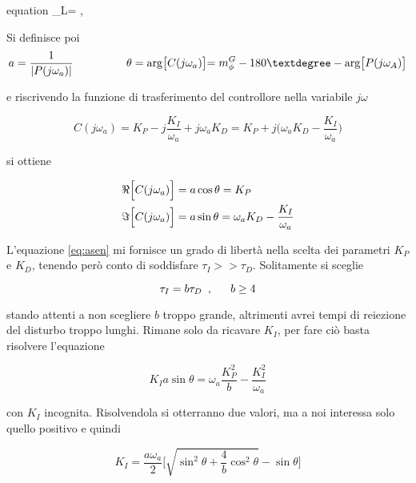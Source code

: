 		\begin{empheq}[box=%
		\fbox]{equation}
			\tau_L=\alpha{} \singleSpacing, \trippleSpacing {}\le\alpha\le{}
			\label{eq:tauL}
		\end{empheq}
		
		\noindent Si definisce poi 
		\begin{equation}
			a=\frac{1}{|P(j\omega_a)|} \trippleSpacing \trippleSpacing \trippleSpacing \theta=\arg\bigl[C(j\omega_a)\bigl]=m_{\phi}^G-180°-\arg\bigl[P(j\omega_A)\bigl]
		\end{equation}
	
		\noindent e riscrivendo la funzione di trasferimento del controllore nella variabile $j\omega$
		
		\begin{equation}
			C(j\omega_a)=K_P-j\frac{K_I}{\omega_a}+j\omega_aK_D=K_P+j\bigl(\omega_aK_D-\frac{K_I}{\omega_a}\bigl)
		\end{equation}
		
		\noindent si ottiene
		
		\begin{align}
			\Re\Bigl[C(j\omega_a)\Bigl] &= a\cos\theta=K_P \\
			\Im\Bigl[C(j\omega_a)\Bigl] &= a\sin\theta=\omega_aK_D-\frac{K_I}{\omega_a}
			\label{eq:asen}
		\end{align}
	
		\noindent L'equazione \ref{eq:asen} mi fornisce un grado di libertà nella scelta dei parametri $K_P$ e $K_D$, tenendo però conto di soddisfare $\tau_I>>\tau_D$. Solitamente si sceglie 
		
		\begin{equation}
			\tau_I=b\tau_D \singleSpacing, \trippleSpacing b\ge4
		\end{equation}
	
		\noindent stando attenti a non scegliere $b$ troppo grande, altrimenti avrei tempi di reiezione del disturbo troppo lunghi. Rimane solo da ricavare $K_I$, per fare ciò basta risolvere l'equazione
		
		\begin{equation}
			K_Ia\sin\theta=\omega_a\frac{K_P^2}{b}-\frac{K_I^2}{\omega_a}
		\end{equation}
	
		\noindent con $K_I$ incognita. Risolvendola si otterranno due valori, ma a noi interessa solo quello positivo e quindi
		
		\begin{equation}
			K_I=\frac{a\omega_a}{2}\Biggl[\sqrt{\sin^2\theta+\frac{4}{b}\cos^2\theta}-\sin\theta\Biggl]
		\end{equation}
		
